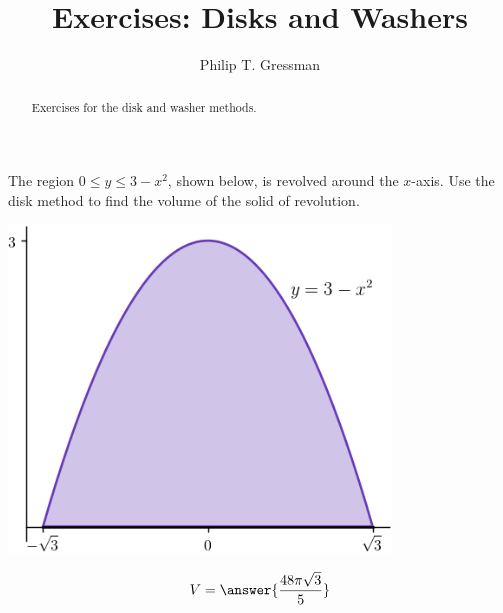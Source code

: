 \documentclass{ximera}
\title{Exercises: Disks and Washers}
\author{Philip T. Gressman}
\begin{document}
\begin{abstract}
Exercises for the disk and washer methods.
\end{abstract}
\maketitle
\begin{problem}
The region $0 \leq y \leq 3 - x^2$, shown below, is revolved around the $x$-axis. Use the disk method to find the volume of the solid of revolution.
\begin{center}
\begin{image}
\includegraphics[width=4in]{test.png}
\end{image}
\end{center}
\begin{prompt}
\[ V = \answer{\frac{48\pi\sqrt{3}}{5}} \]
\end{prompt}



\end{problem}
\end{document}
